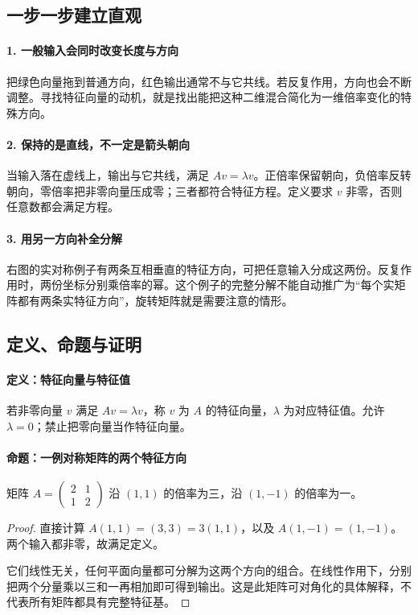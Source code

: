 \subsection*{一步一步建立直观}

\paragraph{1. 一般输入会同时改变长度与方向}

把绿色向量拖到普通方向，红色输出通常不与它共线。若反复作用，方向也会不断调整。寻找特征向量的动机，就是找出能把这种二维混合简化为一维倍率变化的特殊方向。



\paragraph{2. 保持的是直线，不一定是箭头朝向}

当输入落在虚线上，输出与它共线，满足 $Av=\lambda v$。正倍率保留朝向，负倍率反转朝向，零倍率把非零向量压成零；三者都符合特征方程。定义要求 $v$ 非零，否则任意数都会满足方程。



\paragraph{3. 用另一方向补全分解}

右图的实对称例子有两条互相垂直的特征方向，可把任意输入分成这两份。反复作用时，两份坐标分别乘倍率的幂。这个例子的完整分解不能自动推广为“每个实矩阵都有两条实特征方向”，旋转矩阵就是需要注意的情形。



\subsection*{定义、命题与证明}

\paragraph{定义：特征向量与特征值}

若非零向量 $v$ 满足 $Av=\lambda v$，称 $v$ 为 $A$ 的特征向量，$\lambda$ 为对应特征值。允许 $\lambda=0$；禁止把零向量当作特征向量。

\paragraph{命题：一例对称矩阵的两个特征方向}

矩阵 $A=\begin{pmatrix}2&1\\1&2\end{pmatrix}$ 沿 $(1,1)$ 的倍率为三，沿 $(1,-1)$ 的倍率为一。

\begin{proof}

直接计算 $A(1,1)=(3,3)=3(1,1)$，以及 $A(1,-1)=(1,-1)$。两个输入都非零，故满足定义。

它们线性无关，任何平面向量都可分解为这两个方向的组合。在线性作用下，分别把两个分量乘以三和一再相加即可得到输出。这是此矩阵可对角化的具体解释，不代表所有矩阵都具有完整特征基。

\end{proof}
